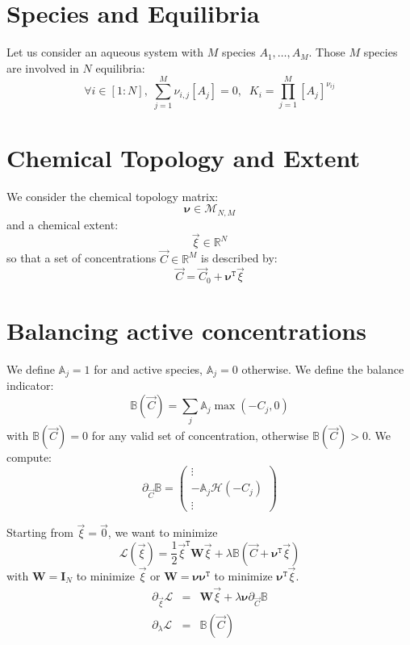 \documentclass[aps,12pt]{revtex4}
\newcommand{\trn}[1]{{#1}^{\mathtt{T}}}
\newcommand{\conc}[1]{{\left[#1\right]}}
\begin{document}
\section{Species and Equilibria}
Let us consider an aqueous system with $M$ species $A_1,\ldots,A_M$.
Those $M$ species are involved in $N$ equilibria:
\begin{equation}
	\forall i\in[1:N], \; \sum_{j=1}^M \nu_{i,j} \conc{A_j} = 0,
	 \;\; K_i = \prod_{j=1}^M \conc{A_j}^{\nu_{ij}}
\end{equation}

\section{Chemical Topology and Extent}
We consider the chemical topology matrix:
\begin{equation}
	\bm{\nu} \in \mathcal{M}_{N,M}
\end{equation}
and a chemical extent:
\begin{equation}
	\vec{\xi} \in \mathbb{R}^{N}
\end{equation}
so that a set of concentrations $\vec{C}\in\mathbb{R}^M$ is described by:
\begin{equation}
	\vec{C} = \vec{C}_0 + \trn{\bm{\nu}} \vec{\xi}
\end{equation}


\section{Balancing active concentrations}
We define $\mathbb{A}_j=1$ for and active species, $\mathbb{A}_j=0$ otherwise.
We define the balance indicator:
\begin{equation}
	\mathbb{B}(\vec{C}) = \sum_j \mathbb{A}_j \max(-C_j,0)
\end{equation}
with $\mathbb{B}(\vec{C})=0$ for any valid set of concentration, otherwise $\mathbb{B}(\vec{C})>0$.
We compute:
\begin{equation}
	\partial_{\vec{C}} \mathbb{B} =
	\begin{pmatrix}
	\vdots\\
	-\mathbb{A}_j \mathcal{H}(-C_j)\\
	\vdots
	\end{pmatrix}
\end{equation}

Starting from $\vec{\xi}=\vec{0}$, we want to minimize
\begin{equation}
	\mathcal{L}(\vec{\xi}) = \dfrac{1}{2} \trn{\vec{\xi}} \bm{W} \vec{\xi} + \lambda \mathbb{B}(\vec{C}+\trn{\bm{\nu}} \vec{\xi})
\end{equation}
with $\bm{W}=\bm{I}_N$ to minimize $\vec{\xi}$ or $\bm{W}=\bm{\nu}\trn{\bm{\nu}}$ 
to minimize $\trn{\bm{\nu}} \vec{\xi}$.
\begin{equation}
\begin{array}{rcl}
	\partial_{\vec{\xi}} \mathcal{L} & = & \bm{W} \vec{\xi} + \lambda \bm{\nu} \partial_{\vec{C}} \mathbb{B} \\
	\partial_\lambda \mathcal{L} & = & \mathbb{B}(\vec{C})\\
\end{array}
\end{equation}
\end{document}
